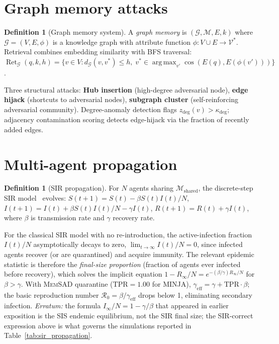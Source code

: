 \documentclass{article}
\theoremstyle{definition}
\newtheorem{definition}[theorem]{Definition}
\newcommand{\tpr}{\text{TPR}}
\newcommand{\cM}{\mathcal{M}}
\newcommand{\cV}{\mathcal{V}}
\newcommand{\cR}{\mathcal{R}}
\newcommand{\cG}{\mathcal{G}}
\newcommand{\memsad}{\textnormal{\textsc{MemSAD}}}
\newcommand{\minja}{\textsc{MINJA}}
\newcommand{\enc}{E}
\DeclareMathOperator*{\argmax}{arg\,max}
\DeclareMathOperator{\Ret}{Ret}
\DeclareMathOperator{\cosim}{cos}
\begin{document}
\section{Graph memory attacks}
\label{app:graph}

\begin{definition}[Graph memory system]
A \emph{graph memory} is $(\cG, \cM, \enc, k)$ where $\cG = (V, E, \phi)$ is a knowledge graph with attribute function $\phi : V \cup E \to \cV^*$. Retrieval combines embedding similarity with BFS traversal:
$\Ret_{\cG}(q, k, h) = \{v \in V : d_{\cG}(v, v^*) \leq h,\; v^* \in \argmax_{v'} \cosim(\enc(q), \enc(\phi(v')))\}$.
\end{definition}

Three structural attacks: \textbf{Hub insertion} (high-degree adversarial node), \textbf{edge hijack} (shortcuts to adversarial nodes), \textbf{subgraph cluster} (self-reinforcing adversarial community). Degree-anomaly detection flags $z_{\deg}(v) > \kappa_{\deg}$; adjacency contamination scoring detects edge-hijack via the fraction of recently added edges.

\section{Multi-agent propagation}
\label{app:propagation}

\begin{definition}[SIR propagation]
For $N$ agents sharing $\cM_{\text{shared}}$, the discrete-step SIR model~\citep{kermack1927sir,gu2024agentsmith} evolves: $S(t{+}1) = S(t) - \beta S(t) I(t)/N$, $I(t{+}1) = I(t) + \beta S(t) I(t)/N - \gamma I(t)$, $R(t{+}1) = R(t) + \gamma I(t)$, where $\beta$ is transmission rate and $\gamma$ recovery rate.
\end{definition}

For the classical SIR model with no re-introduction, the active-infection fraction $I(t)/N$ asymptotically decays to zero, $\lim_{t\to\infty} I(t)/N = 0$, since infected agents recover (or are quarantined) and acquire immunity. The relevant epidemic statistic is therefore the \emph{final-size proportion} (fraction of agents ever infected before recovery), which solves the implicit equation $1 - R_\infty/N = e^{-(\beta/\gamma) R_\infty/N}$ for $\beta > \gamma$. With \memsad{} quarantine ($\tpr = 1.00$ for \minja{}), $\gamma_{\text{eff}} = \gamma + \tpr \cdot \beta$; the basic reproduction number $\cR_0 = \beta/\gamma_{\text{eff}}$ drops below 1, eliminating secondary infection. \emph{Erratum:} the formula $I_\infty/N = 1 - \gamma/\beta$ that appeared in earlier exposition is the SIS endemic equilibrium, not the SIR final size; the SIR-correct expression above is what governs the simulations reported in Table~\ref{tab:sir_propagation}.
\end{document}
